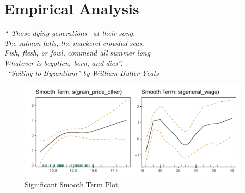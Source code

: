 \chapter{Empirical Analysis}

\textit{``\textendash\ Those dying generations \textendash\ at their song,\\
The salmon-falls, the mackerel-crowded seas,\\
Fish, flesh, or fowl, commend all summer long\\
Whatever is begotten, born, and dies''.\\
\textemdash\ ``Sailing to Byzantium'' by William Butler Yeats }

\vspace{.2cm}


\begin{figure}[h]
    \centering
    \caption{Significant Smooth Term Plot}
    \includegraphics[width=.95\textwidth]{../03_outputs/smoothterm.pdf}
\end{figure}




